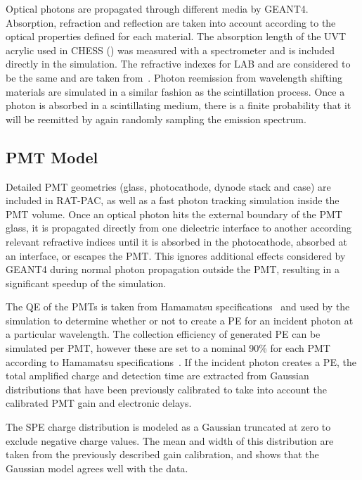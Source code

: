 Optical photons are propagated through different media by GEANT4. 
Absorption, refraction and reflection are taken into account according to the optical properties defined for each material. 
The absorption length of the UVT acrylic used in CHESS () was measured with a spectrometer and is included directly in the simulation.  
The refractive indexes for LAB and {\labppo} are considered to be the same and are taken from~\cite{snop_private}.
Photon reemission from wavelength shifting materials are simulated in a similar fashion as the scintillation process. Once a photon is absorbed in a scintillating medium, there is a finite probability that it will be reemitted by again randomly sampling the emission spectrum.

\subsection{PMT Model \label{sec:pmt_model}}

Detailed PMT geometries (glass, photocathode, dynode stack and case) are included in RAT-PAC, as well as a fast photon tracking simulation inside the PMT volume. 
Once an optical photon hits the external boundary of the PMT glass, it is propagated directly from one dielectric interface to another according relevant refractive indices until it is absorbed in the photocathode, absorbed at an interface, or escapes the PMT.
This ignores additional effects considered by GEANT4 during normal photon propagation outside the PMT, resulting in a significant speedup of the simulation.

The QE of the PMTs is taken from Hamamatsu specifications~\cite{h11934} and used by the simulation to determine whether or not to create a PE for an incident photon at a particular wavelength. 
The collection efficiency of generated PE can be simulated per PMT, however these are set to a nominal 90\% for each PMT according to Hamamatsu specifications~\cite{hamamatsu}.  
If the incident photon creates a PE, the total amplified charge and detection time are extracted from Gaussian distributions that have been previously calibrated to take into account the calibrated PMT gain and electronic delays.

The SPE charge distribution is modeled as a Gaussian truncated at zero to exclude negative charge values. 
The mean and width of this distribution are taken from the previously described gain calibration, and  shows that the Gaussian model agrees well with the data.

